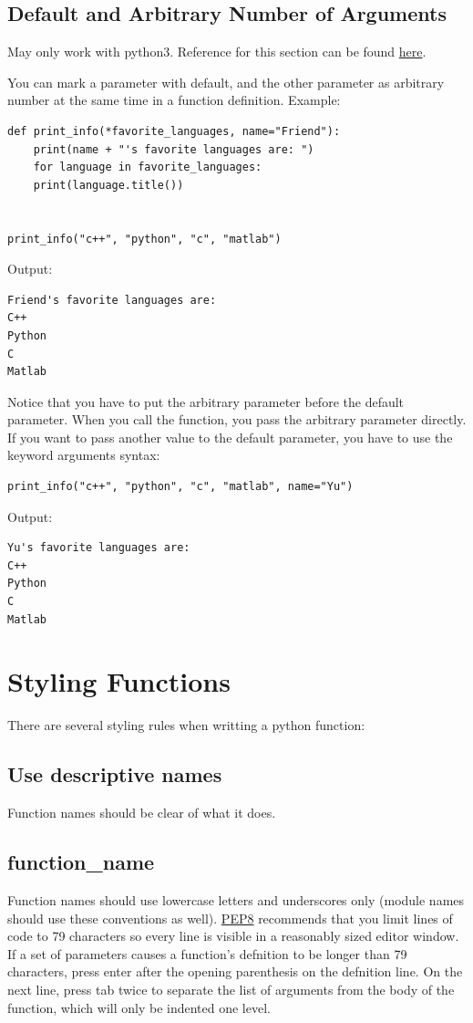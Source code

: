 \documentclass[12pt]{book}
\begin{document}
\subsection{Default and Arbitrary Number of Arguments}
\label{sec:orgc977319}
May only work with python3. Reference for this section can be found \href{https://stackoverflow.com/questions/46446960/how-to-use-default-values-and-arbitrary-arguments-at-one-function-call-in-python}{here}.

You can mark a parameter with default, and the other parameter as arbitrary number at the same time in a function definition. Example:
\begin{verbatim}
def print_info(*favorite_languages, name="Friend"):
    print(name + "'s favorite languages are: ")
    for language in favorite_languages:
	print(language.title())


print_info("c++", "python", "c", "matlab")
\end{verbatim}
Output:
\begin{verbatim}
Friend's favorite languages are: 
C++
Python
C
Matlab
\end{verbatim}
Notice that you have to put the arbitrary parameter before the default parameter. When you call the function, you pass the arbitrary parameter directly. If you want to pass another value to the default parameter, you have to use the keyword arguments syntax:
\begin{verbatim}
print_info("c++", "python", "c", "matlab", name="Yu")
\end{verbatim}
Output:
\begin{verbatim}
Yu's favorite languages are: 
C++
Python
C
Matlab
\end{verbatim}

\section{Styling Functions}
\label{sec:orgd8b0feb}
There are several styling rules when writting a python function:

\subsection{Use descriptive names}
\label{sec:org22ccb46}
Function names should be clear of what it does.

\subsection{function\_name}
\label{sec:org615b4da}
Function names should use lowercase letters and underscores only (module names should use these conventions as well). \href{https://www.python.org/dev/peps/pep-0008/}{PEP8} recommends that you limit lines of code to 79 characters so every line is visible in a reasonably sized editor window. If a set of parameters causes a function’s defnition to be longer than 79 characters, press enter after the opening parenthesis on the defnition line. On the next line, press tab twice to separate the list of arguments from the body of the function, which will only be indented one level.
\end{document}
